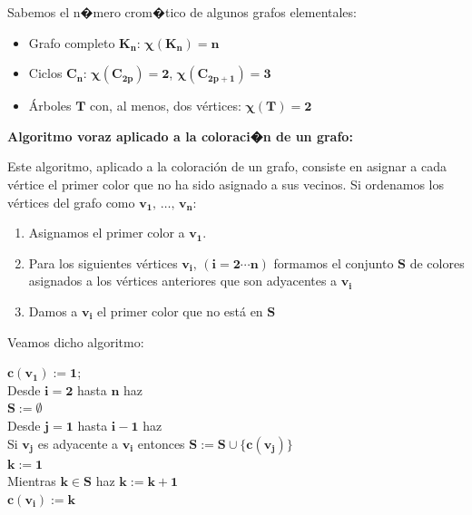 \documentclass[ebook,oneside]{memoir}
\newcommand{\bolds}[1]{\boldsymbol{#1}}
\begin{document}
\vspace{0.4cm}
\noindent Sabemos el n�mero crom�tico de algunos grafos elementales:

\begin{itemize}
\item Grafo completo $\bolds{K_n}$: $\bolds{\chi(K_n)=n}$

\item Ciclos $\bolds{C_n}$: $\bolds{\chi(C_{2p})=2}$, $\bolds{\chi(C_{2p+1})=3}$

\item \'{A}rboles $\bolds{T}$ con, al menos, dos v\'{e}rtices: $\bolds{\chi(T)=2}$
\end{itemize}
\vspace{3cm}

\noindent\textbf{Algoritmo voraz aplicado a la coloraci�n de un grafo:}
\vspace{0.2cm}

Este algoritmo, aplicado a la coloraci\'{o}n de un grafo, consiste en asignar a cada v\'{e}rtice el primer color que no ha sido asignado a sus
vecinos. Si ordenamos los v\'{e}rtices del grafo como $\bolds{v_1,\,\ldots,\,v_n}$:
\vspace{0.2cm}

        \begin{enumerate}
            \item Asignamos el primer color a $\bolds{v_1}$.
            \item Para los siguientes v\'{e}rtices $\bolds{v_i,\,(i=2\cdots n)}$ formamos el conjunto $\bolds{S}$ de colores asignados a los v\'{e}rtices anteriores que son adyacentes a $\bolds{v_i}$
            \item Damos a $\bolds{v_i}$ el primer color que no est\'{a} en $\bolds{S}$
        \end{enumerate}

\vspace{0.2cm}
Veamos dicho algoritmo:
\vspace{0.2cm}

        \noindent $\bolds{c(v_1):=1}$;\\[1ex]
        \textsf{Desde} $\bolds{i=2}$ \textsf{hasta} $\bolds{n}$ \textsf{haz}\\[1ex]
        \hspace*{5ex} $\bolds{S:=\emptyset}$\\
        \hspace*{5ex} \textsf{Desde} $\bolds{j=1}$ \textsf{hasta} $\bolds{i-1}$ \textsf{haz}\\[1ex]
        \hspace*{10ex} \textsf{Si} $\bolds{v_j}$ es adyacente a $\bolds{v_i}$ \textsf{entonces} $\bolds{S:=S\cup\{c(v_j)\}}$\\[1ex]
        \hspace*{5ex} $\bolds{k:=1}$\\[1ex]
        \hspace*{5ex} \textsf{Mientras} $\bolds{k\in S}$ \textsf{haz} $\bolds{k:=k+1}$\\[1ex]
        \hspace*{5ex} $\bolds{c(v_i):=k}$
\end{document}
